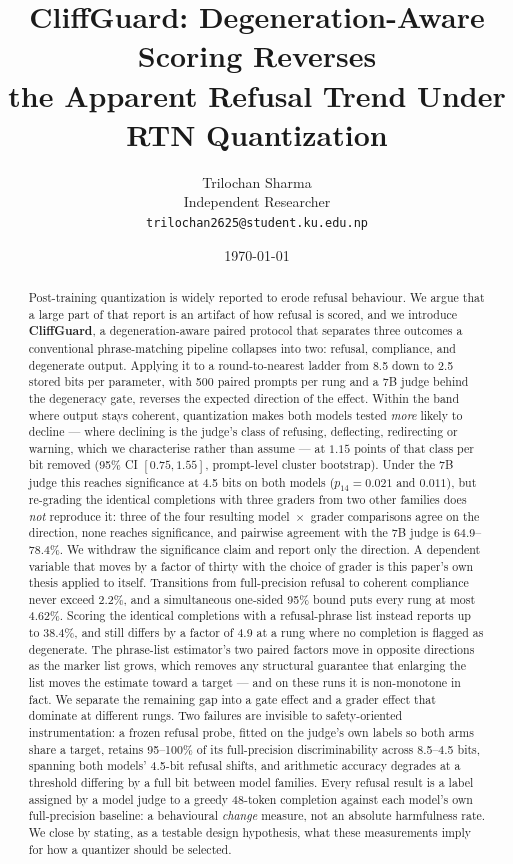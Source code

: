 \documentclass[11pt,a4paper]{article}
\title{\bfseries CliffGuard: Degeneration-Aware Scoring Reverses\\
       the Apparent Refusal Trend Under RTN Quantization}
\author{%
  Trilochan Sharma\\
  \small Independent Researcher\\
  \small \texttt{trilochan2625@student.ku.edu.np}
}
\date{\today}
\begin{document}
\maketitle

\begin{abstract}
\noindent
Post-training quantization is widely reported to erode refusal behaviour. We
argue that a large part of that report is an artifact of how refusal is scored,
and we introduce \textbf{CliffGuard}, a degeneration-aware paired protocol that
separates three outcomes a conventional phrase-matching pipeline collapses into
two: refusal, compliance, and degenerate output. Applying it to a
round-to-nearest ladder from 8.5 down to 2.5 stored bits per parameter, with 500
paired prompts per rung and a 7B judge behind the degeneracy gate, reverses the
expected direction of the effect. Within the band where output stays coherent,
quantization makes both models tested \emph{more} likely to decline --- where
declining is the judge's class of refusing, deflecting, redirecting or warning,
which we characterise rather than assume --- at $1.15$ points of that class per
bit removed (95\% CI $[0.75, 1.55]$, prompt-level cluster bootstrap). Under the
7B judge this reaches significance at 4.5 bits on both models ($p_{14}=0.021$ and
$0.011$), but re-grading the identical completions with three graders from two
other families does \emph{not} reproduce it: three of the four resulting
model~$\times$~grader comparisons agree on the direction, none reaches
significance, and pairwise agreement with the 7B judge is 64.9--78.4\%. We withdraw the significance claim and report only the direction. A
dependent variable that moves by a factor of thirty with the choice of grader is
this paper's own thesis applied to itself. Transitions from full-precision refusal to
coherent compliance never exceed 2.2\%, and a simultaneous one-sided 95\% bound
puts every rung at most 4.62\%. Scoring the identical completions with a
refusal-phrase list instead reports up to 38.4\%, and still differs by a factor
of 4.9 at a rung where no completion is flagged as degenerate. The phrase-list
estimator's two paired factors move in opposite directions as the marker list
grows, which removes any structural guarantee that enlarging the list moves the
estimate toward a target --- and on these runs it is non-monotone in fact. We
separate the remaining gap into a gate effect and a grader effect that dominate
at different rungs. Two failures are invisible to safety-oriented
instrumentation: a frozen refusal probe, fitted on the judge's own labels so both
arms share a target, retains 95--100\% of its full-precision discriminability
across 8.5--4.5 bits, spanning both models' 4.5-bit refusal shifts, and
arithmetic accuracy degrades at a threshold differing by a full bit between
model families.
Every refusal result is a label assigned by a model judge to a greedy 48-token
completion against each model's own full-precision baseline: a behavioural
\emph{change} measure, not an absolute harmfulness rate. We close by stating, as
a testable design hypothesis, what these measurements imply for how a quantizer
should be selected.
\end{abstract}
\end{document}
